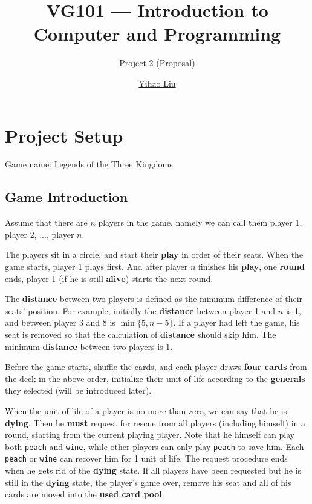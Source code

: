 \documentclass[11pt,a4paper]{article}
\title{VG101 --- Introduction to\\ Computer and Programming}
\subtitle{Project 2 (Proposal)}
\author{\href{mailto:liuyh615@sjtu.edu.cn}{Yihao Liu}}
\begin{document}
\maketitle

\section{Project Setup}

Game name: Legends of the Three Kingdoms 

\subsection{Game Introduction}

Assume that there are $n$ players in the game, namely we can call them player 1, player 2, ..., player $n$. \bigskip

The players sit in a circle, and start their \textbf{play} in order of their seats. When the game starts, player 1 plays first. And after player $n$ finishes his \textbf{play}, one \textbf{round} ends, player 1 (if he is still \textbf{alive}) starts the next round. \bigskip

The \textbf{distance} between two players is defined as the minimum difference of their seats' position. For example, initially the \textbf{distance} between player 1 and $n$ is 1, and between player 3 and 8 is $\min\{5,n-5\}$. If a player had left the game, his seat is removed so that the calculation of \textbf{distance} should skip him. The minimum \textbf{distance} between two players is 1. \bigskip

Before the game starts, shuffle the cards, and each player draws \textbf{four cards} from the deck in the above order, initialize their unit of life according to the \textbf{generals} they selected (will be introduced later). \bigskip

When the unit of life of a player is no more than zero, we can say that he is \textbf{dying}. Then he \textbf{must} request for rescue from all players (including himself) in a round, starting from the current playing player. Note that he himself can play both \texttt{peach} and \texttt{wine}, while other players can only play \texttt{peach} to save him. Each \texttt{peach} or \texttt{wine} can recover him for 1 unit of life. The request procedure ends when he gets rid of the \textbf{dying} state. If all players have been requested but he is still in the \textbf{dying} state, the player's game over, remove his seat and all of his cards are moved into the \textbf{used card pool}. \bigskip
\end{document}
